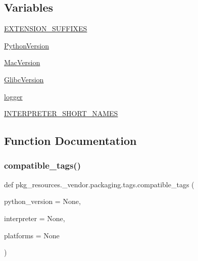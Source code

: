 \subsection*{Variables}
\begin{DoxyCompactItemize}
\item 
\hyperlink{namespacepkg__resources_1_1__vendor_1_1packaging_1_1tags_ab56f94ed2c38297e5e8e561fb595b71d}{E\+X\+T\+E\+N\+S\+I\+O\+N\+\_\+\+S\+U\+F\+F\+I\+X\+ES}
\item 
\hyperlink{namespacepkg__resources_1_1__vendor_1_1packaging_1_1tags_a651409c206b93c593cf697088b5d81a4}{Python\+Version}
\item 
\hyperlink{namespacepkg__resources_1_1__vendor_1_1packaging_1_1tags_a8d190f119a5e4191797121d4f238573e}{Mac\+Version}
\item 
\hyperlink{namespacepkg__resources_1_1__vendor_1_1packaging_1_1tags_a36478e43e05fa97b92ead0e8de4231f5}{Glibc\+Version}
\item 
\hyperlink{namespacepkg__resources_1_1__vendor_1_1packaging_1_1tags_af007b3b6d88e62665721c11be9125168}{logger}
\item 
\hyperlink{namespacepkg__resources_1_1__vendor_1_1packaging_1_1tags_a785f7cd9b096610ea43a8711ef5243ef}{I\+N\+T\+E\+R\+P\+R\+E\+T\+E\+R\+\_\+\+S\+H\+O\+R\+T\+\_\+\+N\+A\+M\+ES}
\end{DoxyCompactItemize}


\subsection{Function Documentation}
\mbox{\label{namespacepkg__resources_1_1__vendor_1_1packaging_1_1tags_af67f4266e13e0498857338a270695196}} 
\subsubsection{\texorpdfstring{compatible\+\_\+tags()}{compatible\_tags()}}
{\footnotesize\ttfamily def pkg\+\_\+resources.\+\_\+vendor.\+packaging.\+tags.\+compatible\+\_\+tags (\begin{DoxyParamCaption}\item[{}]{python\+\_\+version = {\ttfamily None},  }\item[{}]{interpreter = {\ttfamily None},  }\item[{}]{platforms = {\ttfamily None} }\end{DoxyParamCaption})}

